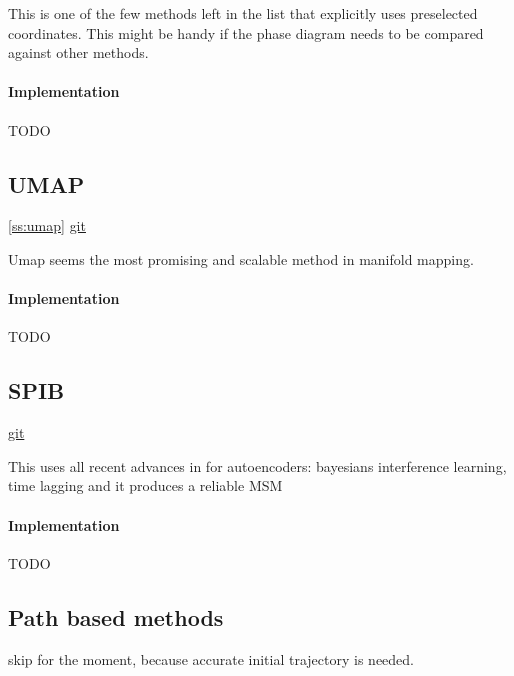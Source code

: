 \documentclass{article}
\begin{document}
This is one of the few methods left in the list that explicitly uses preselected coordinates. This might be handy if the phase diagram needs to be compared against other methods.

\paragraph{Implementation} TODO

\subsection{UMAP} \cref{ss:umap} \href{https://github.com/lmcinnes/umap}{git}

Umap seems the most promising and scalable method in manifold mapping.

\paragraph{Implementation} TODO

\subsection{SPIB} \cite{Wang2021} \href{https://github.com/tiwarylab/State-Predictive-Information-Bottleneck}{git}

This uses all recent advances in for autoencoders: bayesians interference learning, time lagging and it produces a reliable MSM

\paragraph{Implementation} TODO

\subsection{Path based methods} skip for the moment, because accurate initial trajectory is needed.



\end{document}
